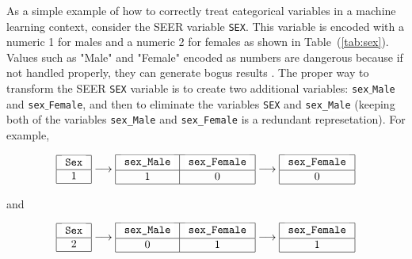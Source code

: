 \documentclass[a4paper,11pt]{article}
\newcommand{\codewhite}[1]{\colorbox{white}{\texttt{#1}}}
\begin{document}
As a simple example of how to correctly treat categorical variables in a machine learning context, consider the SEER variable \codewhite{SEX}. This variable is encoded with a numeric 1 for males and a numeric 2 for females as shown in Table~(\ref{tab:sex}). Values such as "Male" and "Female" encoded as numbers are dangerous because if not handled properly, they can generate bogus results \cite{downey}. The proper way to transform the SEER \codewhite{SEX} variable is to create two additional variables: \codewhite{sex$\_$Male} and \codewhite{sex$\_$Female}, and then to eliminate the variables \codewhite{SEX} and \codewhite{sex\_Male} (keeping both of the variables \codewhite{sex\_Male} and \codewhite{sex\_Female} is a redundant represetation). For example,

 

\begin{equation}
\begin{array}{|c|} \hline
\mbox{\codewhite{Sex}} \\ \hline
1 \\ \hline \end{array} 
\longrightarrow
 \begin{array}{|c|c|}  \hline
\mbox{\codewhite{sex\_Male}} & \mbox{\codewhite{sex\_Female}} \\ \hline
1 & 0 \\ \hline
\end{array} 
\longrightarrow
\begin{array}{|c|}  \hline
\mbox{\codewhite{sex\_Female}} \\ \hline
0  \\ \hline \end{array}
\label{eqn:onehotmale}
\end{equation}



and


\begin{equation}
\begin{array}{|c|} \hline
\mbox{\codewhite{Sex}} \\ \hline
2 \\ \hline \end{array} 
\longrightarrow
 \begin{array}{|c|c|}  \hline
\mbox{\codewhite{sex\_Male}} & \mbox{\codewhite{sex\_Female}} \\ \hline
0 & 1 \\ \hline
\end{array} 
\longrightarrow
\begin{array}{|c|}  \hline
\mbox{\codewhite{sex\_Female}} \\ \hline
1  \\ \hline \end{array}
\label{eqn:onehotfemale}
\end{equation}
\end{document}
